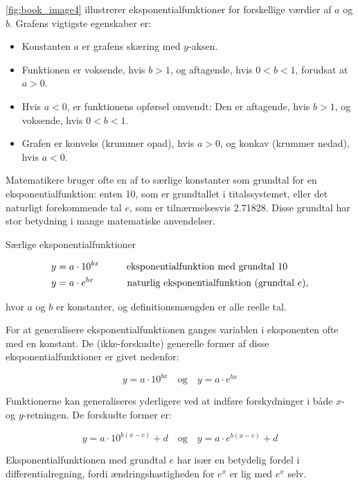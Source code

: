 \autoref{fig:book_image4} illustrerer eksponentialfunktioner for forskellige værdier af \(a\) og \(b\). Grafens vigtigste egenskaber er:
\begin{itemize}
    \item Konstanten \(a\) er grafens skæring med \(y\)-aksen.
    \item Funktionen er voksende, hvis \(b > 1\), og aftagende, hvis \(0 < b < 1\), forudsat at \(a > 0\).
    \item Hvis \(a < 0\), er funktionens opførsel omvendt: Den er aftagende, hvis \(b > 1\), og voksende, hvis \(0 < b < 1\).
    \item Grafen er konveks (krummer opad), hvis \(a > 0\), og konkav (krummer nedad), hvis \(a < 0\).
\end{itemize}

Matematikere bruger ofte en af to særlige konstanter som grundtal for en eksponentialfunktion: enten 10, som er grundtallet i titalssystemet, eller det naturligt forekommende tal \( e \), som er tilnærmelsesvis 2.71828. Disse grundtal har stor betydning i mange matematiske anvendelser.

\begin{definition}{Særlige eksponentialfunktioner}

\begin{align*}
y &= a \cdot 10^{bx} \hspace{1cm} \text{eksponentialfunktion med grundtal 10} \\
y &= a \cdot e^{bx}  \hspace{1.2cm} \text{naturlig eksponentialfunktion (grundtal }e\text{),}
\end{align*}

hvor $a$ og $b$ er konstanter, og definitionsmængden er alle reelle tal.
    
\end{definition}

For at generalisere eksponentialfunktionen ganges variablen i eksponenten ofte med en konstant. De (ikke-forskudte) generelle former af disse eksponentialfunktioner er givet nedenfor:

\[
y = a \cdot 10^{bx}
\quad \text{og} \quad
y = a \cdot e^{bx}
\]

Funktionerne kan generaliseres yderligere ved at indføre forskydninger i både \(x\)- og \(y\)-retningen. De forskudte former er:

\[
y = a \cdot 10^{b(x - c)} + d
\quad \text{og} \quad
y = a \cdot e^{b(x - c)} + d
\]

Eksponentialfunktionen med grundtal \(e\) har især en betydelig fordel i differentialregning, fordi ændringshastigheden for \(e^x\) er lig med \(e^x\) selv.

